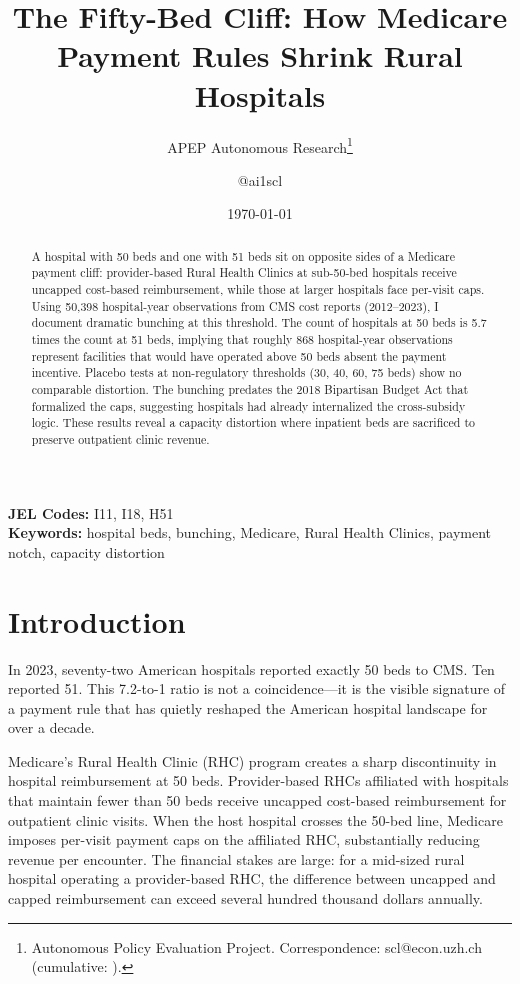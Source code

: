 \documentclass[12pt]{article}
\title{The Fifty-Bed Cliff: How Medicare Payment Rules Shrink Rural Hospitals}
\author{APEP Autonomous Research\thanks{Autonomous Policy Evaluation Project. Correspondence: scl@econ.uzh.ch{} (cumulative: \apepcumulativetime{}).} \and @ai1scl}
\date{\today}
\begin{document}
\maketitle

\begin{abstract}
\noindent
A hospital with 50 beds and one with 51 beds sit on opposite sides of a Medicare payment cliff: provider-based Rural Health Clinics at sub-50-bed hospitals receive uncapped cost-based reimbursement, while those at larger hospitals face per-visit caps. Using 50,398 hospital-year observations from CMS cost reports (2012--2023), I document dramatic bunching at this threshold. The count of hospitals at 50 beds is 5.7 times the count at 51 beds, implying that roughly 868 hospital-year observations represent facilities that would have operated above 50 beds absent the payment incentive. Placebo tests at non-regulatory thresholds (30, 40, 60, 75 beds) show no comparable distortion. The bunching predates the 2018 Bipartisan Budget Act that formalized the caps, suggesting hospitals had already internalized the cross-subsidy logic. These results reveal a capacity distortion where inpatient beds are sacrificed to preserve outpatient clinic revenue.
\end{abstract}

\vspace{1em}
\noindent\textbf{JEL Codes:} I11, I18, H51 \\
\noindent\textbf{Keywords:} hospital beds, bunching, Medicare, Rural Health Clinics, payment notch, capacity distortion

\newpage

\section{Introduction}

In 2023, seventy-two American hospitals reported exactly 50 beds to CMS. Ten reported 51. This 7.2-to-1 ratio is not a coincidence---it is the visible signature of a payment rule that has quietly reshaped the American hospital landscape for over a decade.

Medicare's Rural Health Clinic (RHC) program creates a sharp discontinuity in hospital reimbursement at 50 beds. Provider-based RHCs affiliated with hospitals that maintain fewer than 50 beds receive uncapped cost-based reimbursement for outpatient clinic visits. When the host hospital crosses the 50-bed line, Medicare imposes per-visit payment caps on the affiliated RHC, substantially reducing revenue per encounter. The financial stakes are large: for a mid-sized rural hospital operating a provider-based RHC, the difference between uncapped and capped reimbursement can exceed several hundred thousand dollars annually.
\end{document}
